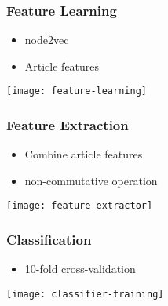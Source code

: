 \begin{frame}
    \centering
    \resizebox{\textwidth}{!}{%
      
    }
\end{frame}


\begin{frame}
    \frametitle{Feature Learning}
    \centering

    \begin{itemize}
      \item node2vec
      \item Article features
    \end{itemize}

    \texttt{[image: feature-learning]}
\end{frame}


\begin{frame}
    \frametitle{Feature Extraction}
    \centering

    \begin{itemize}
      \item Combine article features
      \item non-commutative operation
    \end{itemize}

   \texttt{[image: feature-extractor]}
\end{frame}


\begin{frame}
    \frametitle{Classification}
    \centering

    \begin{itemize}
      \item 10-fold cross-validation
    \end{itemize}

    \texttt{[image: classifier-training]}
\end{frame}


